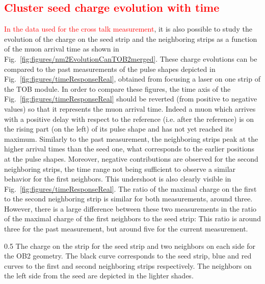 \subsection{\textcolor{red}{Cluster seed charge evolution with time}}

\textcolor{red}{In the data used for the cross talk measurement}, it is also possible to study the evolution of the charge on the seed strip and the neighboring strips as a function of the muon arrival time as shown in Fig.~\ref{fig:figures/nm2EvolutionCanTOB2merged}. These charge evolutions can be compared to the past measurements of the pulse shapes depicted in Fig.~\ref{fig:figures/timeResponseReal}, obtained from focusing a laser on one strip of the TOB module. In order to compare these figures, the time axis of the Fig.~\ref{fig:figures/timeResponseReal} should be reverted  (from positive to negative values) so that it represents the muon arrival time. Indeed a muon which arrives with a positive delay with respect to the reference (i.e. after the reference) is on the rising part (on the left) of its pulse shape and has not yet reached its maximum. Similarly to the past measurement, the neighboring strips peak at the higher arrival times than the seed one, what corresponds to the earlier positions at the pulse shapes. Moreover, negative contributions are observed for the second neighboring strips,  the time range not being sufficient to observe a similar behavior for the first neighbors. This undershoot is also clearly visible in Fig.~\ref{fig:figures/timeResponseReal}. The ratio of the maximal charge on the first to the second neighboring strip is similar for both measurements, around three. However, there is a large difference between these two measurements in the ratio of the maximal charge of the first neighbors to the seed strip: This ratio is around three for the past measurement, but around five for the current measurement. 


                 {0.5}       %
                 { The charge on the strip for the seed strip and two neighbors on each side for the OB2 geometry. The black curve corresponds to the seed strip, blue and red curves to the first and second neighboring strips respectively. The neighbors on the left side from the seed are depicted in the lighter shades. }

